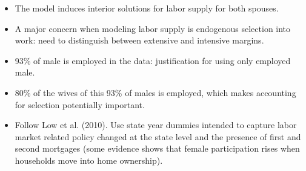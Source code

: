 \documentclass[notes=show]{beamer}
\begin{document}
\begin{frame}%



\begin{itemize}
\item The model induces interior solutions for labor supply for both spouses.

\item A major concern when modeling labor supply is endogenous selection
into work: need to distinguish between extensive and intensive margins.

\item 93\% of male is employed in the data: justification for using only
employed male.

\item 80\% of the wives of this 93\% of males is employed, which makes
accounting for selection potentially important.

\item Follow Low et al. (2010). Use state year dummies intended to capture
labor market related policy changed at the state level and the presence of
first and second mortgages (some evidence shows that female participation
rises when households move into home ownership).
\end{itemize}

\transboxout%
\end{frame}%

\bigskip
\end{document}
